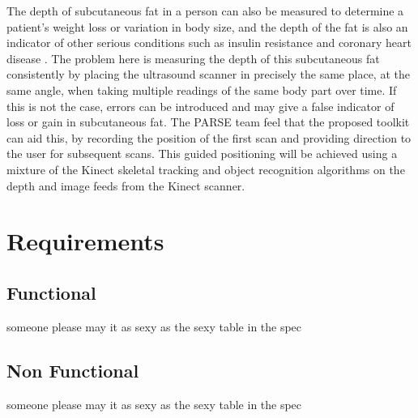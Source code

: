 The depth of subcutaneous fat in a person can also be measured to determine a patient's weight loss or variation in body size, and the depth of the fat is also an indicator of other serious conditions such as insulin resistance \cite{Goodpaster1997} and coronary heart disease \cite{Ducimetiere1986}. The problem here is measuring the depth of this subcutaneous fat consistently by placing the ultrasound scanner in precisely the same place, at the same angle, when taking multiple readings of the same body part over time. If this is not the case, errors can be introduced and may give a false indicator of loss or gain in subcutaneous fat. The PARSE team feel that the proposed toolkit can aid this, by recording the position of the first scan and providing direction to the user for subsequent scans. This guided positioning will be achieved using a mixture of the Kinect skeletal tracking and object recognition algorithms on the depth and image feeds from the Kinect scanner.\\

\section{Requirements}
\label{spec:requirements}
\subsection{Functional}
\label{spec:functional}
someone please may it as sexy as the sexy table in the spec
\subsection{Non Functional}
\label{spec:non functional}
someone please may it as sexy as the sexy table in the spec
